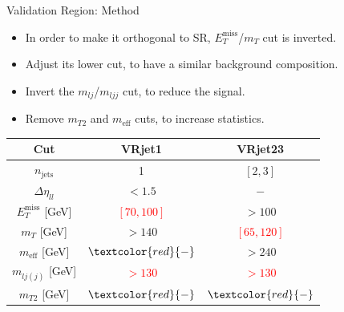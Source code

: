 \documentclass[mathserif,serif]{beamer}
\begin{document}
\begin{frame}{Validation Region: Method}
\begin{itemize}
\item In order to make it orthogonal to SR, $E_T^{\text{miss}}$/$m_{T}$ cut is inverted.
\item Adjust its lower cut, to have a similar background composition.
\item Invert the $m_{lj}$/$m_{ljj}$ cut, to reduce the signal.
\item Remove $m_{T2}$ and $m_{\text{eff}}$ cuts, to increase statistics.
\end{itemize}
\begin{table}[htbp]
\begin{center}
\begin{tabular}{|c|c|c|}
\hline
Cut & VRjet1 & VRjet23 \\
\hline
\hline
$n_{\text{jets}}$               & 1                             & $[2,3]$ \\
$\Delta \eta_{ll}$              & $<1.5$                        & $-$ \\
$E_T^{\text{miss}}$ [GeV]       & \textcolor{red}{ $[70,100]$ } & $>100$ \\
$m_T$ [GeV]                     & $>140$                        & \textcolor{red}{$[65,120]$} \\
$m_{\text{eff}}$ [GeV]          & $\textcolor{red}{-}$          & $>240$ \\
$m_{lj(j)}$ [GeV]               & \textcolor{red}{$>130$}       & \textcolor{red}{$>130$} \\
$m_{T2}$ [GeV]                  & $\textcolor{red}{-}$          & $\textcolor{red}{-}$ \\
\hline
\end{tabular}
\end{center}
\end{table}
\end{frame}
\end{document}
